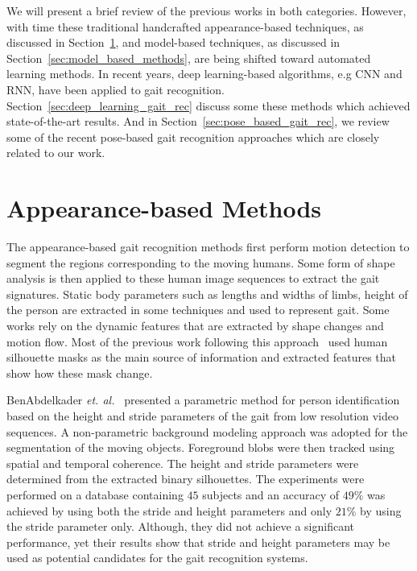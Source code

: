 We will present a brief review of the previous works in both categories. However, with time these traditional handcrafted appearance-based techniques, as discussed in Section~\ref{sec:appearance_based_methods}, and model-based techniques, as discussed in Section~\ref{sec:model_based_methods}, are being shifted toward automated learning methods. In recent years, deep learning-based algorithms, e.g CNN and RNN, have been applied to gait recognition.  Section~\ref{sec:deep_learning_gait_rec} discuss some these methods which achieved state-of-the-art results. And in Section~\ref{sec:pose_based_gait_rec}, we review some of the recent pose-based gait recognition approaches which are closely related to our work. 




\section{Appearance-based Methods} \label{sec:appearance_based_methods}
The appearance-based gait recognition methods first perform motion detection to segment the regions corresponding to the moving humans. Some form of shape analysis is then applied to these human image sequences to extract the gait signatures. Static body parameters such as lengths and widths of limbs, height of the person are extracted in some techniques and used to represent gait. Some works rely on the dynamic features that are extracted by shape changes and motion flow. Most of the previous work following this approach~\cite{Benabdelkader_02, Liu_04, Han_06, Bashir_09, Lam_11} used human silhouette masks as the main source of information and extracted features that show how these mask change. 

BenAbdelkader \textit{et. al.}~\cite{Benabdelkader_02} presented a parametric method for person identification based on the height and stride parameters of the gait from low resolution video sequences. A non-parametric background modeling approach was adopted for the segmentation of the moving objects. Foreground blobs were then tracked using spatial and temporal coherence. The height and stride parameters were determined from the extracted binary silhouettes. The experiments were performed on a database containing $ 45 $ subjects and an accuracy of $ 49\% $ was achieved by using both the stride and height parameters and only $21\%$ by using the stride parameter only. Although, they did not achieve a significant performance, yet their results show that stride and height parameters may be used as potential candidates for the gait recognition systems.

